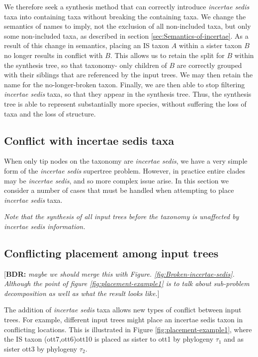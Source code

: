 \documentclass[english]{article}
\begin{document}
We therefore seek a synthesis method that can correctly introduce
\emph{incertae sedis} taxa into containing taxa without breaking the
containing taxa.
We change the semantics of names to imply, not the
exclusion of all non-included taxa, but only some non-included taxa,
as described in section \ref{sec:Semantics-of-incertae}.
As a result
of this change in semantics, placing an IS taxon $A$ within a sister
taxon $B$ no longer results in conflict with $B$.
This allows us to
retain the split for $B$ within the synthesis tree, so that taxonomy-
only children of $B$ are correctly grouped with their siblings that
are referenced by the input trees.
We may then retain the name for the
no-longer-broken taxon.
Finally, we are then able to stop filtering
\emph{incertae sedis} taxa, so that they appear in the synthesis tree.
Thus, the synthesis tree is able to represent substantially more
species, without suffering the loss of taxa and the loss of structure.

\subsection{Conflict with incertae sedis taxa}

When only tip nodes on the taxonomy are \emph{incertae sedis}, we have
a very simple form of the \emph{incertae sedis} supertree problem.
However, in practice entire clades may be \emph{incertae sedis}, and
so more complex issue arise.
In this section we consider a number of
cases that must be handled when attempting to place \emph{incertae
sedis} taxa.

\emph{Note that the synthesis of all input trees before the taxonomy
is unaffected by incertae sedis information.}

\subsection{Conflicting placement among input trees}

{[}\textbf{BDR:} \emph{maybe we should merge this with Figure.
\ref{fig:Broken-incertae-sedis}.
Although the point of figure
\ref{fig:placement-example1} is to talk about sub-problem
decomposition as well as what the result looks like.}{]}

The addition of \emph{incertae sedis} taxa allows new types of
conflict between input trees.
For example, different input trees might
place an incertae sedis taxon in conflicting locations.
This is
illustrated in Figure \ref{fig:placement-example1}, where the IS
taxon (ott7,ott6)ott10 is placed as sister to ott1 by phylogeny
$\tau_{1}$ and as sister ott3 by phylogeny $\tau_{2}$.
\end{document}
